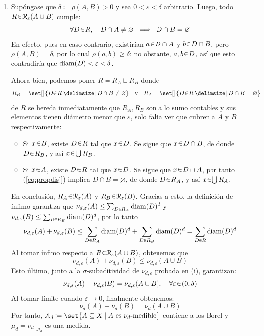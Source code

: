 \begin{sol}
\begin{enumerate}[label = (\roman*), leftmargin=1.5em]
\item %
Supóngase que $\delta\coloneq \rho(A,B)>0$ y sea $0 < \varepsilon<\delta$ arbitrario. Luego, todo $R \en \mathcal{R}_\varepsilon(A\cup B)$ cumple:
\begin{equation}\label{eq:propdisj}
\forall D \en R,
\quad D \cap A \neq \varnothing 
\;\implies\;
D \cap B = \varnothing
\end{equation}
En efecto, pues en caso contrario, existirían $a\en D \cap A$ y $b\en D \cap B$, pero $\rho(A,B) = \delta$, por lo cual $\rho(a,b) \ge \delta$; no obstante, $a,b\en D$, así que esto contradiría que $\operatorname{diam}(D) < \varepsilon < \delta$.\par
Ahora bien, podemos poner $R = R_A \sqcup R_B$ donde 
\[
R_B = \set[\big]{D\en R \given D \cap B \neq \varnothing}
\quad\text{y}\quad
R_A = \set[\big]{D\en R \given D \cap B = \varnothing}
\]
de $R$ se hereda inmediatamente que $R_A,R_B$ son a lo sumo contables y sus elementos tienen diámetro menor que $\varepsilon$, solo falta ver que cubren a $A$ y $B$ respectivamente:
\begin{itemize}[leftmargin=1em]
    \item Si $x\en B$, existe $D\en R$ tal que $x\en D$. Se sigue que $x\en D \cap B$, de donde $D\en R_B$, y así $x \en \bigcup R_B$.
    \item Si $x\en A$, existe $D\en R$ tal que $x\en D$. Se sigue que $x\en D \cap A$, por tanto (\ref{eq:propdisj}) implica $D \cap B = \varnothing$, de donde $D \en R_A$, y así $x\en \bigcup R_A$. 
\end{itemize}
En conclusión, $R_A\en\mathcal{R}_\varepsilon(A)$ y $R_B\en\mathcal{R}_\varepsilon(B)$.
Gracias a esto, la definición de ínfimo garantiza que $\nu_{d,\varepsilon}(A) \leq \sum_{D\en R_A} \diam(D)^d$ y $\nu_{d,\varepsilon}(B) \leq \sum_{D\en R_B} \diam(D)^d$, por lo tanto
\[
\nu_{d,\varepsilon}(A) + \nu_{d,\varepsilon}(B)%
\leq \sum_{D\en R_A} \diam(D)^d + \sum_{D\en R_B} \diam(D)^d%
= \sum_{D\en R} \diam(D)^d
\]
Al tomar ínfimo respecto a $R\en\mathcal{R}_\varepsilon(A\cup B)$, obtenemos que
\[
\nu_{d,\varepsilon}(A) + \nu_{d,\varepsilon}(B) \leq \nu_{d,\varepsilon}(A\cup B)
\]
Esto último, junto a la $\sigma$-subaditividad de $\nu_{d,\varepsilon}$ probada en (i), garantizan:
\[
\nu_{d,\varepsilon}(A) + \nu_{d,\varepsilon}(B) = \nu_{d,\varepsilon}(A\cup B),
\quad\forall \varepsilon \en (0,\delta)
\]
Al tomar límite cuando $\varepsilon \to 0$, finalmente obtenemos:
\[
\nu_{d}(A) + \nu_{d}(B) = \nu_{d}(A\cup B)
\]
Por tanto, $\mathcal{A}_d\coloneq \set{A \subseteq X \mid A \text{ es } \nu_d\text{-medible}}$ contiene a los Borel y $\mu_d = \nu_d|_{\mathcal{A}_d}$ es una medida.

\end{enumerate}
\end{sol}
